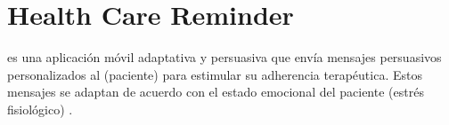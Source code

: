 \chapter{Health Care Reminder}
\label{section:hcr}
\hcr es una aplicación móvil adaptativa y persuasiva que envía mensajes persuasivos personalizados al \care (paciente) para estimular su adherencia terapéutica. Estos mensajes se adaptan de acuerdo con el estado emocional del paciente (estrés fisiológico) \citep{Yoo2011}.